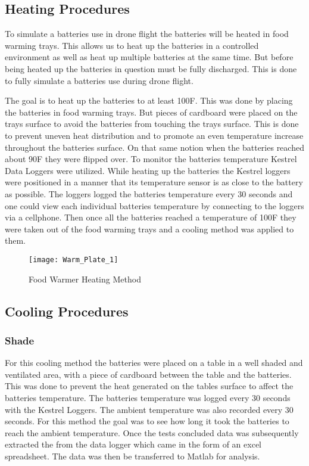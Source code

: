 \documentclass[12pt]{article}
\begin{document}
\vspace{1in}

\subsection{Heating Procedures}

To simulate a batteries use in drone flight the batteries will be heated in food warming trays. This allows us to heat up the batteries in a controlled environment as well as heat up multiple batteries at the same time. But before being heated up the batteries in question must be fully discharged. This is done to fully simulate a batteries use during drone flight.

The goal is to heat up the batteries to at least 100\degree F. This was done by placing the batteries in food warming trays. But pieces of cardboard were placed on the trays surface to avoid the batteries from touching the trays surface. This is done to prevent uneven heat distribution and to promote an even temperature increase throughout the batteries surface. On that same notion when the batteries reached about 90\degree F they were flipped over. To monitor the batteries temperature Kestrel Data Loggers were utilized. While heating up the batteries the Kestrel loggers were positioned in a manner that its temperature sensor is as close to the battery as possible. The loggers logged the batteries temperature every 30 seconds and one could view each individual batteries temperature by connecting to the loggers via a cellphone. Then once all the batteries reached a temperature of 100\degree F they were taken out of the food warming trays and a cooling method was applied to them. 

\begin{figure}[H]
	\centering
	\texttt{[image: Warm\_Plate\_1]}
	\caption{Food Warmer Heating Method}
	\label{fig:Food Warmer}
\end{figure}

\subsection{Cooling Procedures}

\subsubsection{Shade}

For this cooling method the batteries were placed on a table in a well shaded and ventilated area, with a piece of cardboard between the table and the batteries. This was done to prevent the heat generated on the tables surface to affect the batteries temperature. The batteries temperature was logged every 30 seconds with the Kestrel Loggers. The ambient temperature was also recorded every 30 seconds. For this method the goal was to see how long it took the batteries to reach the ambient temperature. Once the tests concluded data was subsequently extracted the from the data logger which came in the form of an excel spreadsheet. The data was then be transferred to Matlab for analysis. 
\end{document}
